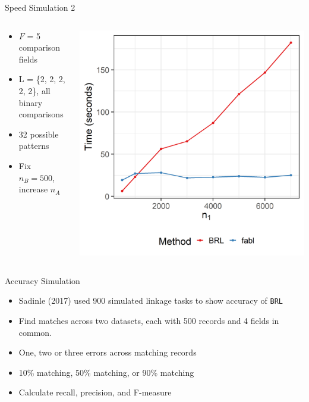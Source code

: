\documentclass{beamer}
\begin{document}
\begin{frame}{Speed Simulation 2}
	\begin{columns}
		\begin{column}{0.38\textwidth}
			\begin{itemize}
				\item $F$ = 5 comparison fields
				\item L = \{2, 2, 2, 2, 2\}, all binary comparisons
				\item 32 possible patterns
				\item Fix $n_B = 500$, increase $n_A$
			\end{itemize}
		\end{column}
		\begin{column}{0.58\textwidth}
			\includegraphics[width = \textwidth, height = \textwidth ]{../notes/figures/speed_plot_fixed_nB_slides.png}
		\end{column}
	\end{columns}
\end{frame}

\begin{frame}{Accuracy Simulation}
	\begin{itemize}
		\item Sadinle (2017) used 900 simulated linkage tasks to show accuracy of \texttt{BRL}
		\item Find matches across two datasets, each with 500 records and 4 fields in common. 
		\item One, two or three errors across matching records
		\item 10\% matching, 50\% matching, or 90\% matching
		\item Calculate recall, precision, and F-measure 
	\end{itemize}
\end{frame}
\end{document}
